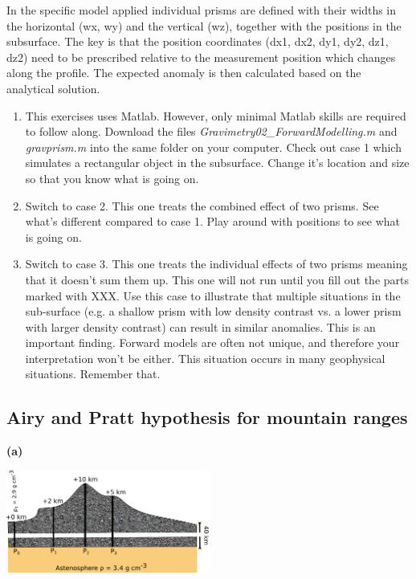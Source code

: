 \documentclass[a4paper,12pt]{article}
\begin{document}
In the specific model applied individual prisms are defined with their widths in the horizontal (wx, wy) and the vertical (wz), together with the positions in the subsurface. The key is that the position coordinates (dx1, dx2, dy1, dy2, dz1, dz2) need to be prescribed relative to the measurement position which changes along the profile. The expected anomaly is then calculated based on the analytical solution.
\begin{enumerate}[label=(\alph*)]

  \item This exercises uses Matlab. However, only minimal Matlab skills are required to follow along. Download the files \textit{Gravimetry02\_ForwardModelling.m} and \textit{gravprism.m} into the same folder on your computer. Check out case 1 which simulates a rectangular object in the subsurface. Change it's location and size so that you know what is going on.

  \item Switch to case 2. This one treats the combined effect of two prisms. See what's different compared to case 1. Play around with positions to see what is going on.

  \item Switch to case 3. This one treats the individual effects of two prisms meaning that it doesn't sum them up. This one will not run until you fill out the parts marked with XXX. Use this case to illustrate that multiple situations in the sub-surface (e.g. a shallow prism with low density contrast vs. a lower prism with larger density contrast) can result in similar anomalies. This is an important finding. Forward models are often not unique, and therefore your interpretation won't be either. This situation occurs in many geophysical situations. Remember that.
\end{enumerate}
\begin{tcolorbox}[enhanced jigsaw,breakable,pad at break*=1mm,
  colback=blue!5!white,colframe=babyblueeyes,title=Solutions,
  watermark color=white]
  
\end{tcolorbox}

\subsection{Airy and Pratt hypothesis for mountain ranges}
\textbf{(a)}

\begin{center}
\includegraphics[width=0.5\textwidth]{Figures/Gravimetry/Pratt.png}
\end{center}
\end{document}
